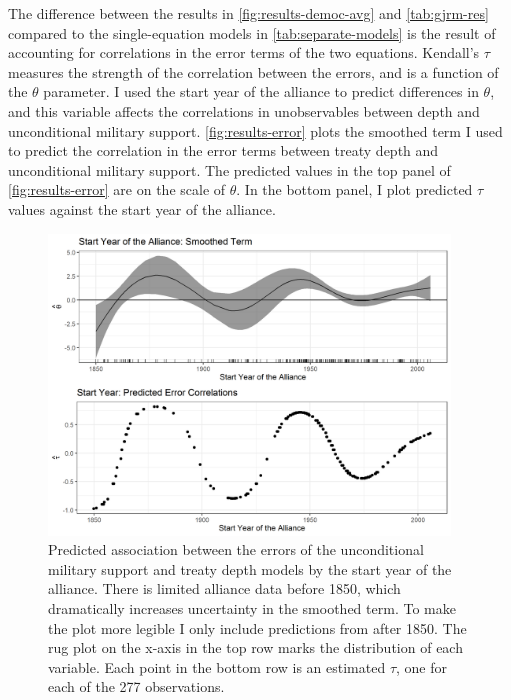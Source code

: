 \documentclass[12pt]{article}
\begin{document}
The difference between the results in \autoref{fig:results-democ-avg} and \autoref{tab:gjrm-res} compared to the single-equation models in \autoref{tab:separate-models} is the result of accounting for correlations in the error terms of the two equations. 
Kendall's $\tau$ measures the strength of the correlation between the errors, and is a function of the $\theta$ parameter.
I used the start year of the alliance to predict differences in $\theta$, and this variable affects the correlations in unobservables between depth and unconditional military support. 
\autoref{fig:results-error} plots the smoothed term I used to predict the correlation in the error terms between treaty depth and unconditional military support. 
The predicted values in the top panel of \autoref{fig:results-error} are on the scale of $\theta$. 
In the bottom panel, I plot predicted $\tau$ values against the start year of the alliance. 


\begin{figure}[hbtp]
\centering
\includegraphics[width=0.95\textwidth]{../figures/results-error.png}
\caption{Predicted association between the errors of the unconditional military support and treaty depth models by the start year of the alliance. There is limited alliance data before 1850, which dramatically increases uncertainty in the smoothed term. To make the plot more legible I only include predictions from after 1850. The rug plot on the x-axis in the top row marks the distribution of each variable. Each point in the bottom row is an estimated $\tau$, one for each of the 277 observations.}
\label{fig:results-error}
\end{figure}
\end{document}
